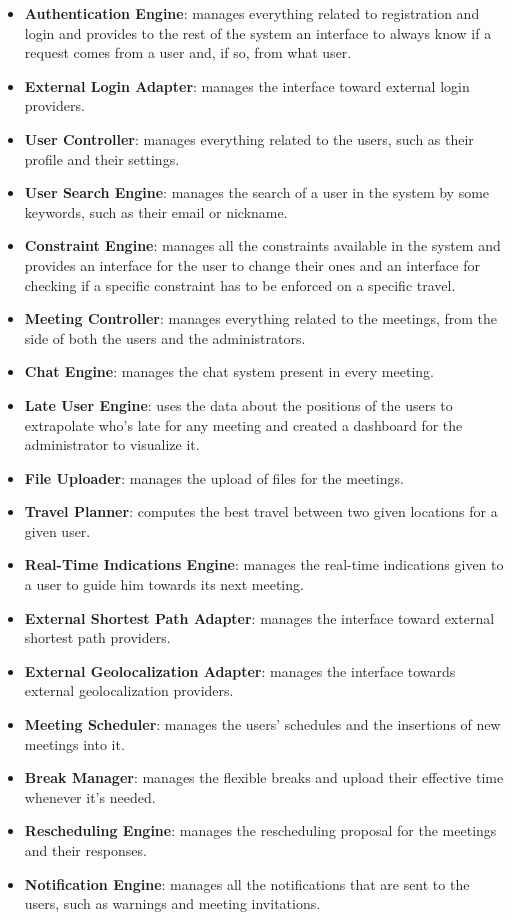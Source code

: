 \begin{itemize}
\item \textbf{Authentication Engine}: manages everything related to registration and login and provides to the rest of the system an interface to always know if a request comes from a user and, if so, from what user.
\item \textbf{External Login Adapter}: manages the interface toward external login providers.
\item \textbf{User Controller}: manages everything related to the users, such as their profile and their settings.
\item \textbf{User Search Engine}: manages the search of a user in the system by some keywords, such as their email or nickname.
\item \textbf{Constraint Engine}: manages all the constraints available in the system and provides an interface for the user to change their ones and an interface for checking if a specific constraint has to be enforced on a specific travel.
\item \textbf{Meeting Controller}: manages everything related to the meetings, from the side of both the users and the administrators.
\item \textbf{Chat Engine}: manages the chat system present in every meeting.
\item \textbf{Late User Engine}: uses the data about the positions of the users to extrapolate who's late for any meeting and created a dashboard for the administrator to visualize it.
\item \textbf{File Uploader}: manages the upload of files for the meetings.
\item \textbf{Travel Planner}: computes the best travel between two given locations for a given user.
\item \textbf{Real-Time Indications Engine}: manages the real-time indications given to a user to guide him towards its next meeting.
\item \textbf{External Shortest Path Adapter}: manages the interface toward external shortest path providers.
\item \textbf{External Geolocalization Adapter}: manages the interface towards external geolocalization providers.
\item \textbf{Meeting Scheduler}: manages the users' schedules and the insertions of new meetings into it.
\item \textbf{Break Manager}: manages the flexible breaks and upload their effective time whenever it's needed.
\item \textbf{Rescheduling Engine}: manages the rescheduling proposal for the meetings and their responses.
\item \textbf{Notification Engine}: manages all the notifications that are sent to the users, such as warnings and meeting invitations.
\end{itemize}